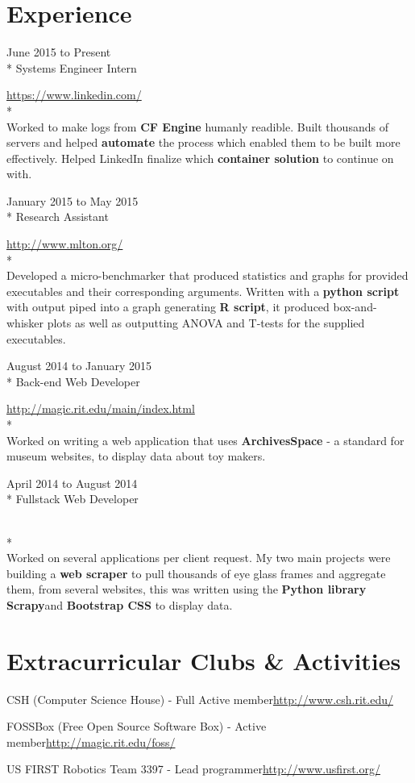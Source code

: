 \documentclass[a4paper,margin,line]{resume}
\newcommand{\rurl}[1]{\hfill {\footnotesize \url{#1}}}
\newcommand{\rdate}[1]{\hfill {\small #1}}
\newcommand{\rproject}[4]{\item[#1] \hfill \rdate{#2} \\* \hfill \rdate{#3} \strut\hfill \rurl{#4} \\*}
\begin{document}
\begin{resume}
\section{\mysidestyle Experience}
	\begin{asparadesc}
        \rproject{LinkedIn}{June 2015 to Present}{Systems Engineer Intern}{https://www.linkedin.com/}
        \\
        \small
        Worked to make logs from {\bf CF Engine} humanly readible. Built thousands of servers and helped {\bf automate}
        the process which enabled them to be built more effectively. Helped LinkedIn finalize which {\bf container 
        solution} to continue on with.
        \normalsize
        \\
        \rproject{Golisano College of Computing and Informational Sciences}{January 2015 to May 2015}{Research Assistant}{http://www.mlton.org/} 
        \\
        \small
        Developed a micro-benchmarker that produced statistics and graphs for provided executables
        and their corresponding arguments. Written with a {\bf python script} with output piped into
        a graph generating {\bf R script}, it produced box-and-whisker plots as well as outputting ANOVA and
        T-tests for the supplied executables.
        \normalsize
        \\
        \rproject{Media Arts Games Interaction and Creativity Center at RIT}{August 2014 to January 2015}{Back-end Web Developer}{http://magic.rit.edu/main/index.html}
		\small
        \\
        Worked on writing a web application that uses {\bf ArchivesSpace} - a
        standard for museum websites, to display data about toy makers.\normalsize
        \\
        \rproject{Earth Moves}{April 2014 to August 2014}{Fullstack Web Developer}{}
        \\
		\small
        Worked on several applications per client request. My two main projects
        were building a {\bf web scraper} to pull thousands of eye glass frames and
        aggregate them, from several websites, this was written using the {\bf Python
        library Scrapy}and {\bf Bootstrap CSS} to display data.
    \end{asparadesc}
\section{\mysidestyle Extracurricular Clubs \& Activities}
	\begin{asparablank}
    \item CSH ({\small Computer Science House}) - {\small Full Active member}\rurl{http://www.csh.rit.edu/}
    \item FOSSBox ({\small Free Open Source Software Box}) - {\small Active member}\rurl{http://magic.rit.edu/foss/}
    \item US FIRST Robotics Team 3397 - {\small Lead programmer}\rurl{http://www.usfirst.org/}
	\end{asparablank}

\end{resume}
\end{document}
